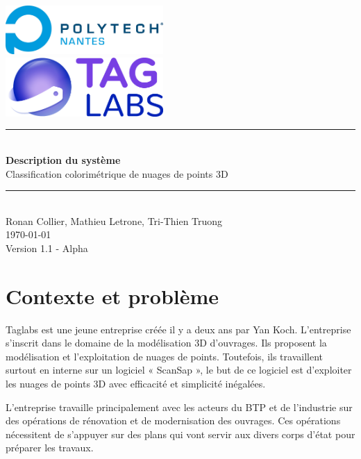 \documentclass[12pt,titlepage,french]{article}
\begin{document}
\begin{titlepage}
\newcommand{\HRule}{\rule{\linewidth}{0.5mm}}
\center

  \includegraphics[width=0.45\textwidth]{../ressources/img_logos/logo_polytech.png}\\[1cm]

  \includegraphics[width=0.45\textwidth]{../ressources/img_logos/logo_taglabs.png}


\HRule \\[0.4cm]
{ \huge \bfseries Description du système \\[0.15cm] }
Classification colorimétrique de nuages de points 3D
\HRule \\[1.5cm]
Ronan Collier,
Mathieu Letrone,
Tri-Thien Truong
\\[1cm]
\today \\ [1cm]
Version 1.1 - Alpha
\end{titlepage}

\tableofcontents %
\newpage
\listoffigures  %
\newpage
\section{Contexte et problème}

Taglabs est une jeune entreprise créée il y a deux ans par Yan Koch. L’entreprise s’inscrit dans le domaine de la modélisation 3D d’ouvrages. Ils proposent la modélisation et l’exploitation de nuages de points. Toutefois, ils travaillent surtout en interne sur un logiciel « ScanSap », le but de ce logiciel est d’exploiter les nuages de points 3D avec efficacité et simplicité inégalées. \newline

L’entreprise travaille principalement avec les acteurs du BTP et de l’industrie sur des opérations de rénovation et de modernisation des ouvrages. Ces opérations nécessitent de s’appuyer sur des plans qui vont servir aux divers corps d’état pour préparer les travaux.\newline
\end{document}
